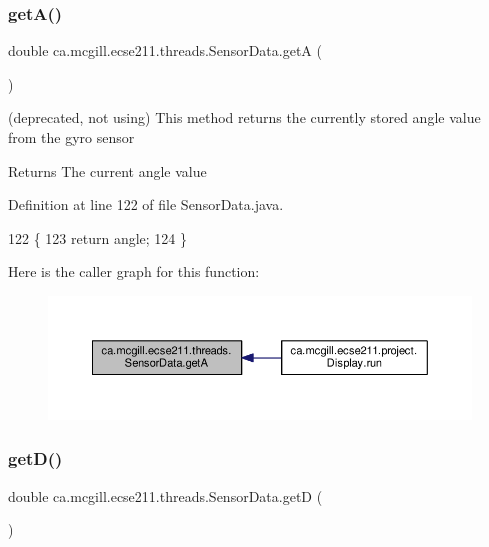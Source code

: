 \subsubsection{\texorpdfstring{get\+A()}{getA()}}
{\footnotesize\ttfamily double ca.\+mcgill.\+ecse211.\+threads.\+Sensor\+Data.\+getA (\begin{DoxyParamCaption}{ }\end{DoxyParamCaption})}

(deprecated, not using) This method returns the currently stored angle value from the gyro sensor

\begin{DoxyReturn}{Returns}
The current angle value 
\end{DoxyReturn}


Definition at line 122 of file Sensor\+Data.\+java.


\begin{DoxyCode}
122                        \{
123     \textcolor{keywordflow}{return} angle;
124   \}
\end{DoxyCode}
Here is the caller graph for this function\+:\nopagebreak
\begin{figure}[H]
\begin{center}
\leavevmode
\includegraphics[width=350pt]{classca_1_1mcgill_1_1ecse211_1_1threads_1_1_sensor_data_acc8f6cc56f39c8ea6b812cd8b135eca6_icgraph}
\end{center}
\end{figure}
\mbox{\label{classca_1_1mcgill_1_1ecse211_1_1threads_1_1_sensor_data_a46cc30522719018a80f89624e0ce458f}} 
\subsubsection{\texorpdfstring{get\+D()}{getD()}}
{\footnotesize\ttfamily double ca.\+mcgill.\+ecse211.\+threads.\+Sensor\+Data.\+getD (\begin{DoxyParamCaption}{ }\end{DoxyParamCaption})}

